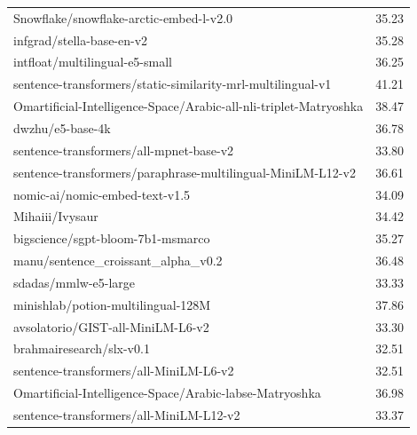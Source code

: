 \begin{xltabular}{\textwidth}{X c}
    Snowflake/snowflake-arctic-embed-l-v2.0                              & 35.23                    \\
    infgrad/stella-base-en-v2                                            & 35.28                    \\
    intfloat/multilingual-e5-small                                       & 36.25                    \\
    sentence-transformers/static-similarity-mrl-multilingual-v1          & 41.21                    \\
    Omartificial-Intelligence-Space/Arabic-all-nli-triplet-Matryoshka    & 38.47                    \\
    dwzhu/e5-base-4k                                                     & 36.78                    \\
    sentence-transformers/all-mpnet-base-v2                              & 33.80                    \\
    sentence-transformers/paraphrase-multilingual-MiniLM-L12-v2          & 36.61                    \\
    nomic-ai/nomic-embed-text-v1.5                                       & 34.09                    \\
    Mihaiii/Ivysaur                                                      & 34.42                    \\
    bigscience/sgpt-bloom-7b1-msmarco                                    & 35.27                    \\
    manu/sentence\_croissant\_alpha\_v0.2                                & 36.48                    \\
    sdadas/mmlw-e5-large                                                 & 33.33                    \\
    minishlab/potion-multilingual-128M                                   & 37.86                    \\
    avsolatorio/GIST-all-MiniLM-L6-v2                                    & 33.30                    \\
    brahmairesearch/slx-v0.1                                             & 32.51                    \\
    sentence-transformers/all-MiniLM-L6-v2                               & 32.51                    \\
    Omartificial-Intelligence-Space/Arabic-labse-Matryoshka              & 36.98                    \\
    sentence-transformers/all-MiniLM-L12-v2                              & 33.37                    \\

\end{xltabular}
